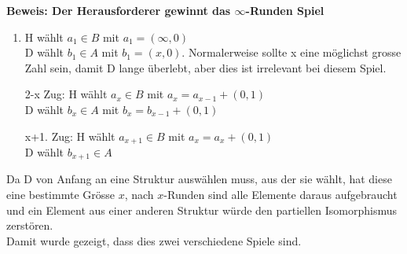 \documentclass[a4paper,10pt]{article}
\begin{document}
\textbf{Beweis: Der Herausforderer gewinnt das $\infty$-Runden Spiel}
		\begin{enumerate}[1. \text{Zug:}]
			\item  	H wählt $a_1 \in B$ mit $a_1 = (\infty, 0)$ \\
				D wählt $b_1 \in A$ mit $b_1 = (x,0)$. Normalerweise sollte x eine möglichst grosse Zahl sein, damit D lange überlebt, aber dies ist irrelevant bei diesem Spiel.
			\item[2-x Zug:] 	H wählt $a_x \in B$ mit $a_x = a_{x-1} + (0,1)$ \\
				D wählt $b_x \in A$ mit $b_x = b_{x-1} + (0,1)$

			\item[x+1. Zug:] 	H wählt $a_{x+1} \in B$ mit $a_x = a_{x} + (0,1)$ \\
						D wählt $b_{x+1} \in A$	
		\end{enumerate}
		Da D von Anfang an eine Struktur auswählen muss, aus der sie wählt, hat diese eine bestimmte Grösse $x$, nach $x$-Runden sind alle Elemente daraus aufgebraucht und ein Element aus einer anderen Struktur würde den partiellen Isomorphismus zerstören. \\

		Damit wurde gezeigt, dass dies zwei verschiedene Spiele sind.
\end{document}
